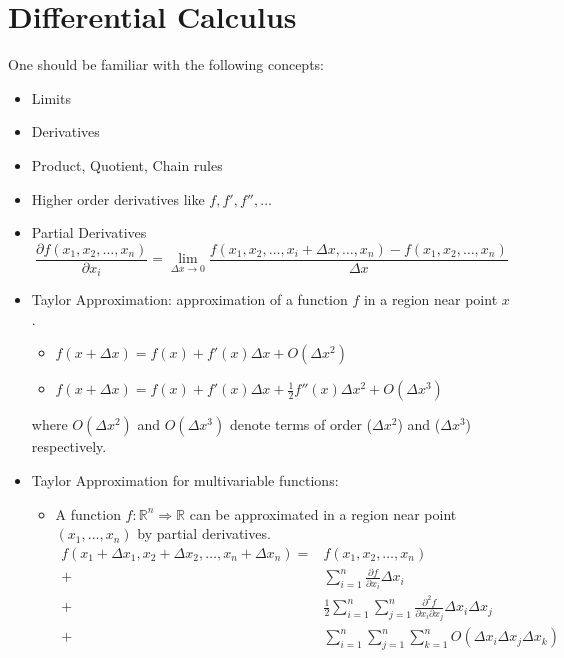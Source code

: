 \section{Differential Calculus}
One should be familiar with the following concepts:
\begin{itemize}
    \item Limits
    \item Derivatives
    \item Product, Quotient, Chain rules
    \item Higher order derivatives like $f, f', f'', \ldots$
    \item Partial Derivatives 
    \[
    \frac{\partial f(x_1, x_2, \ldots, x_n)}{\partial x_i} = \lim_{\Delta x \to 0} \frac{f(x_1, x_2, \ldots, x_i + \Delta x, \ldots, x_n) - f(x_1, x_2, \ldots, x_n)}{\Delta x}
    \]
    \item Taylor Approximation: approximation of a function $f$ in a region near point $x$.
    \begin{itemize}[label=\textbullet]
        \item $f(x+\Delta x) = f(x) + f'(x)\Delta x + O(\Delta x^2)$
        \item $f(x+\Delta x) = f(x) + f'(x)\Delta x + \frac{1}{2}f''(x)\Delta x^2 + O(\Delta x^3)$
    \end{itemize}
    where $O(\Delta x^2)$ and $O(\Delta x^3)$ denote terms of order ($\Delta x^2$) and ($\Delta x^3$) respectively.
    \item Taylor Approximation for multivariable functions:
    \begin{itemize}[label=\textbullet]
        \item A function $f:\mathbb{R}^n \Rightarrow \mathbb{R}$ can be approximated in a region near point $(x_1, \ldots, x_n)$ by partial derivatives.
        \begin{align*}
            f(x_1 + \Delta x_1, x_2 + \Delta x_2, \ldots, x_n + \Delta x_n) =&
            f(x_1, x_2, \ldots, x_n) \\+& \sum_{i=1}^n \frac{\partial f}{\partial x_i} \Delta x_i \\+& \frac{1}{2} \sum_{i=1}^n \sum_{j=1}^n \frac{\partial^2 f}{\partial x_i \partial x_j} \Delta x_i \Delta x_j \\+&
            \sum_{i=1}^n \sum_{j=1}^n \sum_{k=1}^n O(\Delta x_i \Delta x_j \Delta x_k)
        \end{align*}
    \end{itemize}
\end{itemize}

